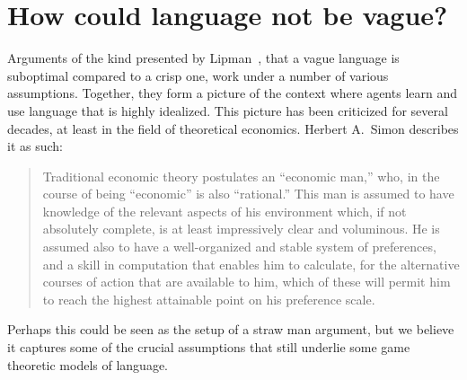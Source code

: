 \documentclass[a4paper]{article}
\begin{document}
%
%


\section{How could language not be vague?}
\label{sec:finite-experience}
Arguments of the kind presented by Lipman~\parencite*{lipman_why_2009}, that a vague language is suboptimal compared to a crisp one, work under a number of various assumptions.
Together, they form a picture of the context where agents learn and use language that is highly idealized.
This picture has been criticized for several decades, at least in the field of theoretical economics.
Herbert A.~Simon describes it as such:
\begin{quote}
Traditional economic theory postulates an ``economic man,'' who, in the course of being ``economic'' is also ``rational.''
This man is assumed to have knowledge of the relevant aspects of his environment which, if not absolutely complete, is at least impressively clear and voluminous.
He is assumed also to have a well-organized and stable system of preferences, and a skill in computation that enables him to calculate, for the alternative courses of action that are available to him, which of these will permit him to reach the highest attainable point on his preference scale.%
~\parencite[99]{simon_behavioral_1955}
\end{quote}
Perhaps this could be seen as the setup of a straw man argument, but we believe it captures some of the crucial assumptions that still underlie some game theoretic models of language.
\end{document}
